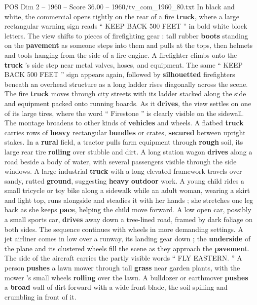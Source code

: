 \begin{textsample}{POS Dim 2 – 1960 – Score 36.00 – 1960/tv\_com\_1960\_80.txt}  \label{ex:f2_pos_001}
In black and white, the commercial opens tightly on the rear of a fire \textbf{truck}, where a large rectangular warning sign reads “ KEEP BACK 500 FEET ” in bold white block letters.
The view shifts to pieces of firefighting gear : tall rubber \textbf{boots} standing on the \textbf{pavement} as someone steps into them and pulls at the tops, then helmets and tools hanging from the side of a fire engine.
A firefighter climbs onto the \textbf{truck} ’s side step near metal valves, hoses, and equipment.
The same “ KEEP BACK 500 FEET ” sign appears again, followed by \textbf{silhouetted} firefighters beneath an overhead structure as a long ladder rises diagonally across the scene.
The fire \textbf{truck} moves through city streets with its ladder stacked along the side and equipment packed onto running boards.
As it \textbf{drives}, the view settles on one of its large tires, where the word “ Firestone ” is clearly visible on the sidewall.
The montage broadens to other kinds of \textbf{vehicles} and wheels.
A flatbed \textbf{truck} carries rows of \textbf{heavy} rectangular \textbf{bundles} or crates, \textbf{secured} between upright stakes.
In a \textbf{rural} field, a tractor pulls farm equipment through \textbf{rough} soil, its large rear tire \textbf{rolling} over stubble and dirt.
A long station wagon \textbf{drives} along a road beside a body of water, with several passengers visible through the side windows.
A large industrial \textbf{truck} with a long elevated framework travels over sandy, rutted \textbf{ground}, suggesting \textbf{heavy} \textbf{outdoor} work.
A young child rides a small tricycle or toy bike along a sidewalk while an adult woman, wearing a skirt and light top, runs alongside and steadies it with her hands ; she stretches one leg back as she keeps \textbf{pace}, helping the child move forward.
A low open car, possibly a small sports car, \textbf{drives} away down a tree-lined road, framed by dark foliage on both sides.
The sequence continues with wheels in more demanding settings.
A jet airliner comes in low over a runway, its landing gear down ; the \textbf{underside} of the plane and its clustered wheels fill the scene as they approach the \textbf{pavement}.
The side of the aircraft carries the partly visible words “ FLY EASTERN. ” A person \textbf{pushes} a lawn mower through tall \textbf{grass} near garden plants, with the mower ’s small wheels \textbf{rolling} over the lawn.
A bulldozer or earthmover \textbf{pushes} a \textbf{broad} wall of dirt forward with a wide front blade, the soil spilling and crumbling in front of it.

\end{textsample}
